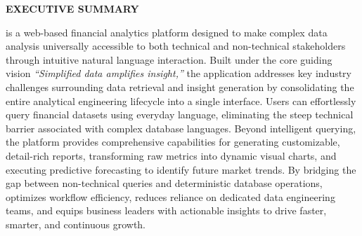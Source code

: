 {\raggedright \noindent \textbf{\Large EXECUTIVE SUMMARY}\par}
\vspace{0.3cm}

\noindent \projname{} is a web-based financial analytics platform designed to make complex data analysis universally accessible to both technical and non-technical stakeholders through intuitive natural language interaction. Built under the core guiding vision \textit{“Simplified data amplifies insight,”} the application addresses key industry challenges surrounding data retrieval and insight generation by consolidating the entire analytical engineering lifecycle into a single interface. Users can effortlessly query financial datasets using everyday language, eliminating the steep technical barrier associated with complex database languages. Beyond intelligent querying, the platform provides comprehensive capabilities for generating customizable, detail-rich reports, transforming raw metrics into dynamic visual charts, and executing predictive forecasting to identify future market trends. By bridging the gap between non-technical queries and deterministic database operations, \projname{} optimizes workflow efficiency, reduces reliance on dedicated data engineering teams, and equips business leaders with actionable insights to drive faster, smarter, and continuous growth.

\clearpage